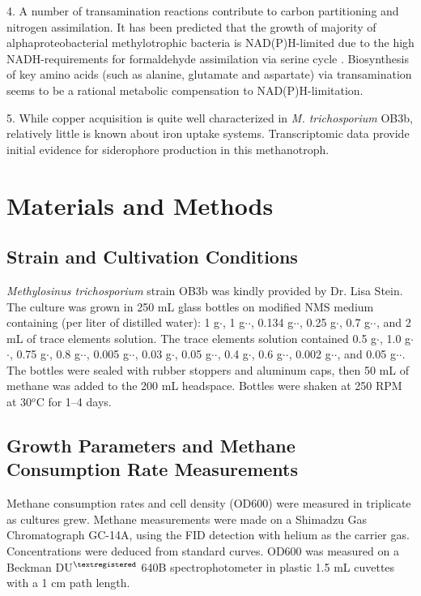 4. A number of transamination reactions contribute to carbon partitioning and nitrogen assimilation.
It has been predicted that the growth of majority of alphaproteobacterial methylotrophic bacteria is NAD(P)H-limited due to the high NADH-requirements for formaldehyde assimilation via serine cycle \cite{anthony1978}.
Biosynthesis of key amino acids (such as alanine, glutamate and aspartate) via transamination seems to be a rational metabolic compensation to NAD(P)H-limitation.

5. While copper acquisition is quite well characterized in \textit{M. trichosporium} OB3b, relatively little is known about iron uptake systems.
Transcriptomic data provide initial evidence for siderophore production in this methanotroph.

\section{Materials and Methods}
\subsection{Strain and Cultivation Conditions}
\textit{Methylosinus trichosporium} strain OB3b was kindly provided by Dr. Lisa Stein.
The culture was grown in 250 mL glass bottles on modified NMS medium \cite{whittenbury1970} containing (per liter of distilled water): 1 g$\cdot$, 1 g$\cdot$$\cdot$, 0.134 g$\cdot$$\cdot$, 0.25 g$\cdot$, 0.7 g$\cdot$$\cdot$, and 2 mL of trace elements solution.
The trace elements solution contained 0.5 g$\cdot$, 1.0 g$\cdot$$\cdot$, 0.75 g$\cdot$, 0.8 g$\cdot$$\cdot$, 0.005 g$\cdot$$\cdot$, 0.03 g$\cdot$, 0.05 g$\cdot$$\cdot$, 0.4 g$\cdot$, 0.6 g$\cdot$$\cdot$, 0.002 g$\cdot$$\cdot$, and 0.05 g$\cdot$$\cdot$.
The bottles were sealed with rubber stoppers and aluminum caps, then 50 mL of methane was added to the 200 mL headspace.
Bottles were shaken at 250 RPM at 30$^o$C for 1–4 days.

\subsection{Growth Parameters and Methane Consumption Rate Measurements}
Methane consumption rates and cell density (OD600) were measured in triplicate as cultures grew.
Methane measurements were made on a Shimadzu Gas Chromatograph GC-14A, using the FID detection with helium as the carrier gas.
Concentrations were deduced from standard curves.
OD600 was measured on a Beckman DU$^{\textregistered}$ 640B spectrophotometer in plastic 1.5 mL cuvettes with a 1 cm path length.

